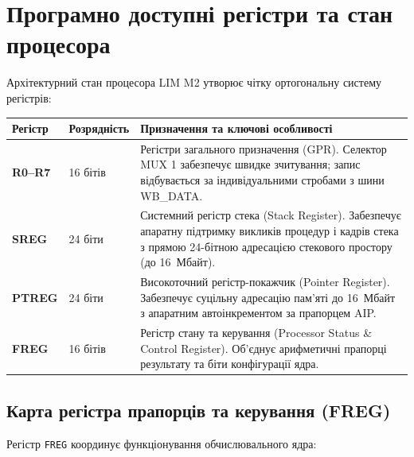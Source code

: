 \documentclass[11pt,a4paper]{article}
\newcommand{\reg}[1]{\texttt{#1}}
\begin{document}
\section{Програмно доступні регістри та стан процесора}
Архітектурний стан процесора LIM M2 утворює чітку ортогональну систему регістрів:

\begin{longtable}{>{\ttfamily\bfseries}p{25mm}p{28mm}p{93mm}}
\toprule
Регістр & Розрядність & Призначення та ключові особливості \\
\midrule\endhead
R0--R7 & 16 бітів & Регістри загального призначення (GPR). Селектор MUX 1 забезпечує швидке зчитування; запис відбувається за індивідуальними стробами з шини WB\_DATA. \\
SREG & 24 біти & Системний регістр стека (Stack Register). Забезпечує апаратну підтримку викликів процедур і кадрів стека з прямою 24-бітною адресацією стекового простору (до 16~Мбайт). \\
PTREG & 24 біти & Високоточний регістр-покажчик (Pointer Register). Забезпечує суцільну адресацію пам'яті до 16~Мбайт з апаратним автоінкрементом за прапорцем AIP. \\
FREG & 16 бітів & Регістр стану та керування (Processor Status \& Control Register). Об'єднує арифметичні прапорці результату та біти конфігурації ядра. \\
\bottomrule
\end{longtable}

\subsection{Карта регістра прапорців та керування (FREG)}
Регістр \reg{FREG} координує функціонування обчислювального ядра:
\end{document}
